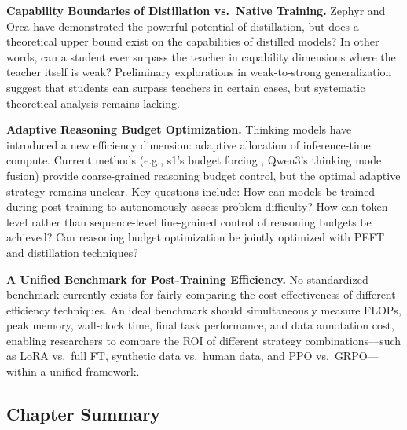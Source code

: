 \begin{openproblembox}
\textbf{Capability Boundaries of Distillation vs.\ Native Training.}
Zephyr and Orca have demonstrated the powerful potential of distillation,
but does a theoretical upper bound exist on the capabilities of distilled models?
In other words, can a student ever surpass the teacher in capability dimensions where the teacher itself is weak?
Preliminary explorations in weak-to-strong generalization \cite{burns2023weak} suggest that
students can surpass teachers in certain cases,
but systematic theoretical analysis remains lacking.
\end{openproblembox}

\begin{openproblembox}
\textbf{Adaptive Reasoning Budget Optimization.}
Thinking models have introduced a new efficiency dimension: adaptive allocation of inference-time compute.
Current methods (e.g., s1's budget forcing \cite{muennighoff2025s1}, Qwen3's thinking mode fusion)
provide coarse-grained reasoning budget control, but the optimal adaptive strategy remains unclear.
Key questions include: How can models be trained during post-training to autonomously assess problem difficulty?
How can token-level rather than sequence-level fine-grained control of reasoning budgets be achieved?
Can reasoning budget optimization be jointly optimized with PEFT and distillation techniques?
\end{openproblembox}

\begin{openproblembox}
\textbf{A Unified Benchmark for Post-Training Efficiency.}
No standardized benchmark currently exists for fairly comparing the cost-effectiveness of different efficiency techniques.
An ideal benchmark should simultaneously measure FLOPs, peak memory, wall-clock time,
final task performance, and data annotation cost,
enabling researchers to compare the ROI of different strategy combinations---such as LoRA vs.\ full FT,
synthetic data vs.\ human data, and PPO vs.\ GRPO---within a unified framework.
\end{openproblembox}

\subsection{Chapter Summary}


